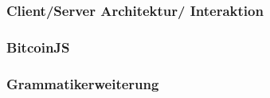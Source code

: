 \documentclass[a4paper,12pt]{article}
\begin{document}
\subsubsection*{Client/Server Architektur/ Interaktion}
\subsubsection*{BitcoinJS}
\subsubsection*{Grammatikerweiterung}




\end{document}
